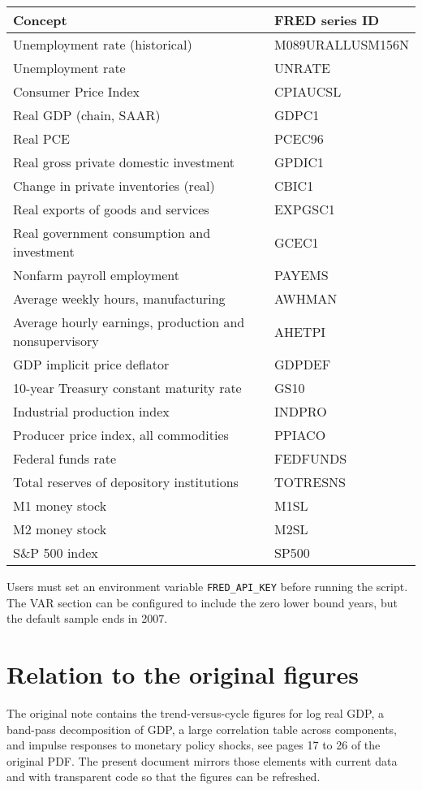 \documentclass[11pt]{article}
\begin{document}
\begin{center}
\begin{tabular}{ll}
\toprule
Concept & FRED series ID \\
\midrule
Unemployment rate (historical) & M089URALLUSM156N \\
Unemployment rate & UNRATE \\
Consumer Price Index & CPIAUCSL \\
Real GDP (chain, SAAR) & GDPC1 \\
Real PCE & PCEC96 \\
Real gross private domestic investment & GPDIC1 \\
Change in private inventories (real) & CBIC1 \\
Real exports of goods and services & EXPGSC1 \\
Real government consumption and investment & GCEC1 \\
Nonfarm payroll employment & PAYEMS \\
Average weekly hours, manufacturing & AWHMAN \\
Average hourly earnings, production and nonsupervisory & AHETPI \\
GDP implicit price deflator & GDPDEF \\
10-year Treasury constant maturity rate & GS10 \\
Industrial production index & INDPRO \\
Producer price index, all commodities & PPIACO \\
Federal funds rate & FEDFUNDS \\
Total reserves of depository institutions & TOTRESNS \\
M1 money stock & M1SL \\
M2 money stock & M2SL \\
S\&P 500 index & SP500 \\
\bottomrule
\end{tabular}
\end{center}

Users must set an environment variable \texttt{FRED\_API\_KEY} before running the script. The VAR section can be configured to include the zero lower bound years, but the default sample ends in 2007.

\section{Relation to the original figures}

The original note contains the trend-versus-cycle figures for log real GDP, a band-pass decomposition of GDP, a large correlation table across components, and impulse responses to monetary policy shocks, see pages 17 to 26 of the original PDF. The present document mirrors those elements with current data and with transparent code so that the figures can be refreshed. 
\end{document}
